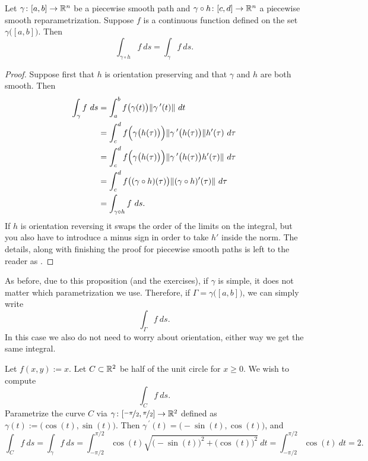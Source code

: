 \begin{prop} \label{mv:prop:lineintrepararam}
Let $\gamma \colon [a,b] \to {\mathbb{R}}^n$ be a piecewise smooth path and
$\gamma \circ h \colon [c,d] \to {\mathbb{R}}^n$ a piecewise smooth reparametrization.
Suppose $f$ is a continuous function defined on the set
$\gamma\bigl([a,b]\bigr)$.  Then
\begin{equation*}
\int_{\gamma \circ h} f~ ds = \int_{\gamma} f~ ds .
\end{equation*}
\end{prop}

\begin{proof}
Suppose first that $h$ is orientation preserving and that $\gamma$ and $h$
are both smooth.  Then 
\begin{equation*}
\begin{split}
\int_{\gamma} f ~ ds
& =
\int_a^b 
f\bigl(\gamma(t)\bigr) \lVert {\gamma^{\:\prime}(t)} \rVert ~ dt
\\
& =
\int_c^d 
f\Bigl(\gamma\bigl(h(\tau)\bigr)\Bigr)
\lVert {\gamma^{\:\prime}\bigl(h(\tau)\bigr)} \rVert h'(\tau) ~ d\tau
\\
& =
\int_c^d 
f\Bigl(\gamma\bigl(h(\tau)\bigr)\Bigr)
\lVert {\gamma^{\:\prime}\bigl(h(\tau)\bigr) h'(\tau)} \rVert ~ d\tau
\\
& =
\int_c^d 
f\bigl((\gamma \circ h)(\tau)\bigr) \lVert {(\gamma \circ h)'(\tau)} \rVert ~ d\tau
\\
& = 
\int_{\gamma \circ h} f ~ ds .
\end{split}
\end{equation*}
If $h$ is orientation reversing it swaps the order of the limits on the
integral, but you also have to introduce a minus sign in order
to take $h'$ inside the norm.
The details, along with finishing the proof for piecewise smooth
paths is left to the reader as .
\end{proof}

As before,
due to this proposition (and the exercises),
if $\gamma$ is simple, it does not matter which
parametrization we use.  Therefore, if $\Gamma = \gamma\bigl( [a,b] \bigr)$, we can
simply write
\begin{equation*}
\int_\Gamma f~ ds .
\end{equation*}
In this case we also do not need to worry about orientation, either way we
get the same integral.

\begin{example}
Let $f(x,y) := x$.  Let $C \subset {\mathbb{R}}^2$ be half of the unit circle for $x
\geq 0$.  We wish to compute
\begin{equation*}
\int_C f ~ ds .
\end{equation*}
Parametrize the curve $C$ via $\gamma \colon
[\nicefrac{-\pi}{2},\nicefrac{\pi}{2}] \to {\mathbb{R}}^2$ defined as
$\gamma(t) := \bigl(\cos(t),\sin(t)\bigr)$.
Then $\gamma^{\:\prime}(t) = \bigl(-\sin(t),\cos(t)\bigr)$, and
\begin{equation*}
\int_C f ~ ds =
\int_\gamma f ~ ds
=
\int_{-\pi/2}^{\pi/2} \cos(t) \sqrt{ {\bigl(-\sin(t)\bigr)}^2 +  
{\bigl(\cos(t)\bigr)}^2 } ~ dt
=
\int_{-\pi/2}^{\pi/2} \cos(t) ~ dt = 2.
\end{equation*}
\end{example}

